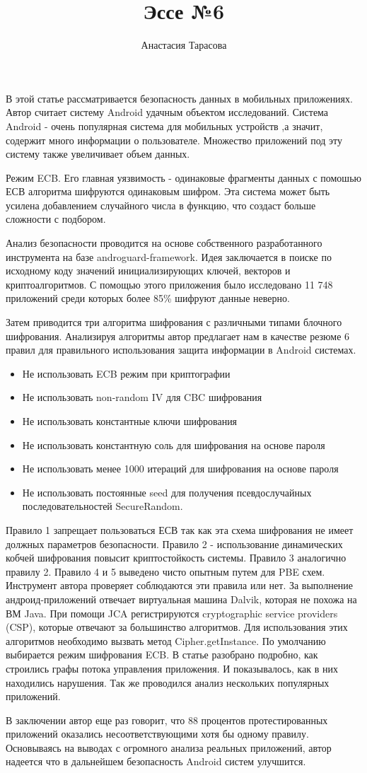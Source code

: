 \documentclass{article}
\title{Эссе №6}
\author{Анастасия Тарасова}
\begin{document}
	\maketitle

В этой статье рассматривается безопасность данных в мобильных приложениях. Автор считает систему Android  удачным объектом исследований. Система Android - очень популярная система для мобильных устройств ,а значит, содержит много информации о пользователе. Множество приложений под эту систему также увеличивает объем данных.

Режим ECB. Его главная уязвимость - одинаковые фрагменты данных с помошью ЕСВ алгоритма шифруются одинаковым шифром. Эта система может быть усилена добавлением случайного числа в функцию, что создаст больше сложности с подбором.

Анализ безопасности проводится на основе собственного разработанного инструмента на базе androguard-framework. Идея заключается в поиске по исходному коду значений инициализирующих ключей, векторов и криптоалгоритмов. С помощью этого приложения было исследовано 11 748 приложений среди которых более 85\% шифруют данные неверно.

Затем приводится три алгоритма шифрования с различными типами блочного шифрования. Анализируя алгоритмы автор предлагает нам в качестве резюме 6 правил для правильного использования защита информации в Android системах.

\begin{itemize}
\item Не использовать ECB режим при криптографии
\item Не использовать non-random IV для CBC шифрования
\item Не использовать константные ключи шифрования
\item Не использовать константную соль для шифрования на основе пароля
\item Не использовать менее 1000 итераций для шифрования на основе пароля
\item Не использовать постоянные seed для получения псевдослучайных последовательностей SecureRandom.
\end{itemize}

Правило 1 запрещает пользоваться ЕСВ так как эта схема шифрования не имеет должных параметров безопасности.
Правило 2 - использование динамических кобчей шифрования повысит криптостойкость системы.
Правило 3 аналогично правилу 2.
Правило 4 и 5 выведено чисто опытным путем для PBE схем.
Инструмент автора проверяет соблюдаются эти правила или нет. За выполнение андроид-приложений отвечает виртуальная машина Dalvik, которая не похожа на ВМ Java. При помощи JCA регистрируются cryptographic service providers (CSP), которые отвечают за большинство алгоритмов. Для использования этих алгоритмов необходимо вызвать метод Cipher.getInstance. По умолчанию выбирается режим шифрования ECB. В статье разобрано подробно, как строились графы потока управления приложения. И показывалось, как в них находились нарушения. Так же проводился анализ нескольких популярных приложений.

В заключении автор еще раз говорит, что 88 процентов протестированных приложений оказались несоответствующими хотя бы одному правилу. Основываясь на выводах с огромного анализа реальных приложений, автор надеется что в дальнейшем безопасность Android систем улучшится. 
	
\end{document}
